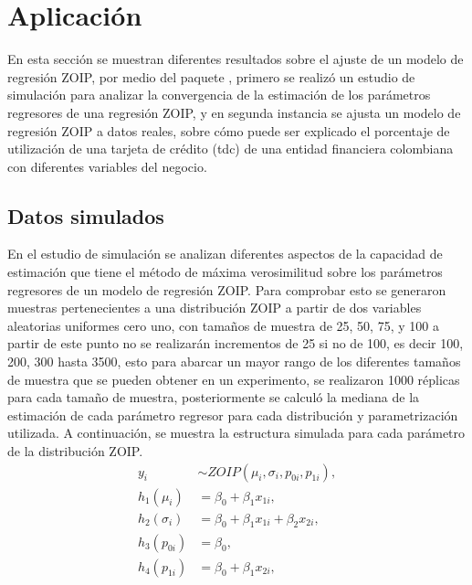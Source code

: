 \section{Aplicaci\'{o}n}
En esta secci\'{o}n se muestran diferentes resultados sobre el ajuste de un modelo de regresi\'{o}n ZOIP, por medio del paquete , primero se realiz\'{o} un estudio de simulaci\'{o}n para analizar la convergencia de la estimaci\'{o}n de los par\'{a}metros regresores de una regresi\'{o}n ZOIP, y en segunda instancia se ajusta un modelo de regresi\'{o}n ZOIP a datos reales, sobre c\'{o}mo puede ser explicado el porcentaje de utilizaci\'{o}n de una tarjeta de cr\'{e}dito (tdc) de una entidad financiera colombiana con diferentes variables del negocio.

\subsection{Datos simulados}
En el estudio de simulaci\'{o}n se analizan diferentes aspectos de la capacidad de estimaci\'{o}n que tiene el m\'{e}todo de m\'{a}xima verosimilitud sobre los par\'{a}metros regresores de un modelo de regresi\'{o}n ZOIP. Para comprobar esto se generaron muestras pertenecientes a una distribuci\'{o}n ZOIP a partir de dos variables aleatorias uniformes cero uno, con tama\~{n}os de muestra de 25, 50, 75, y 100 a partir de este punto no se realizar\'{a}n incrementos de 25 si no de 100, es decir 100, 200, 300 hasta 3500, esto para abarcar un mayor rango de los diferentes tama\~{n}os de muestra que se pueden obtener en un experimento, se realizaron 1000 r\'{e}plicas para cada tama\~{n}o de muestra, posteriormente se calcul\'{o} la mediana de la estimaci\'{o}n de cada par\'{a}metro regresor para cada distribuci\'{o}n y parametrizaci\'{o}n utilizada. A continuaci\'{o}n, se muestra la estructura simulada para cada par\'{a}metro de la distribuci\'{o}n ZOIP.
\begin{equation}
\begin{split}
y_{i} & \sim ZOIP(\mu_{i},\sigma_{i},p_{0i}, p_{1i}),\\
h_1(\mu_{i}) &=\beta_0+\beta_1x_{1i},\\
h_2(\sigma_{i}) &=\beta_0+\beta_1x_{1i}+\beta_2x_{2i},\\
h_3(p_{0i}) &=\beta_0,\\
h_4(p_{1i}) &=\beta_0+\beta_1x_{2i},
\end{split}
\label{S_eq_reg}
\end{equation}

